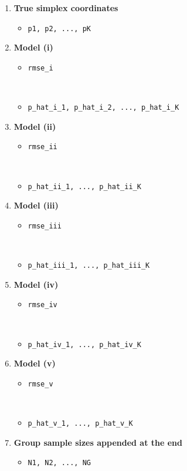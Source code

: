 \documentclass[
]{article}
\providecommand{\tightlist}{%
  \setlength{\itemsep}{0pt}\setlength{\parskip}{0pt}}
\begin{document}
\begin{enumerate}
\def\labelenumi{\arabic{enumi}.}
\tightlist
\item
  \textbf{True simplex coordinates}

  \begin{itemize}
  \tightlist
  \item
    \texttt{p1,\ p2,\ ...,\ pK}
  \end{itemize}
\item
  \textbf{Model (i)}

  \begin{itemize}
  \tightlist
  \item
    \texttt{rmse\_i}\strut \\
  \item
    \texttt{p\_hat\_i\_1,\ p\_hat\_i\_2,\ ...,\ p\_hat\_i\_K}
  \end{itemize}
\item
  \textbf{Model (ii)}

  \begin{itemize}
  \tightlist
  \item
    \texttt{rmse\_ii}\strut \\
  \item
    \texttt{p\_hat\_ii\_1,\ ...,\ p\_hat\_ii\_K}
  \end{itemize}
\item
  \textbf{Model (iii)}

  \begin{itemize}
  \tightlist
  \item
    \texttt{rmse\_iii}\strut \\
  \item
    \texttt{p\_hat\_iii\_1,\ ...,\ p\_hat\_iii\_K}
  \end{itemize}
\item
  \textbf{Model (iv)}

  \begin{itemize}
  \tightlist
  \item
    \texttt{rmse\_iv}\strut \\
  \item
    \texttt{p\_hat\_iv\_1,\ ...,\ p\_hat\_iv\_K}
  \end{itemize}
\item
  \textbf{Model (v)}

  \begin{itemize}
  \tightlist
  \item
    \texttt{rmse\_v}\strut \\
  \item
    \texttt{p\_hat\_v\_1,\ ...,\ p\_hat\_v\_K}
  \end{itemize}
\item
  \textbf{Group sample sizes appended at the end}

  \begin{itemize}
  \tightlist
  \item
    \texttt{N1,\ N2,\ ...,\ NG}
  \end{itemize}
\end{enumerate}
\end{document}
